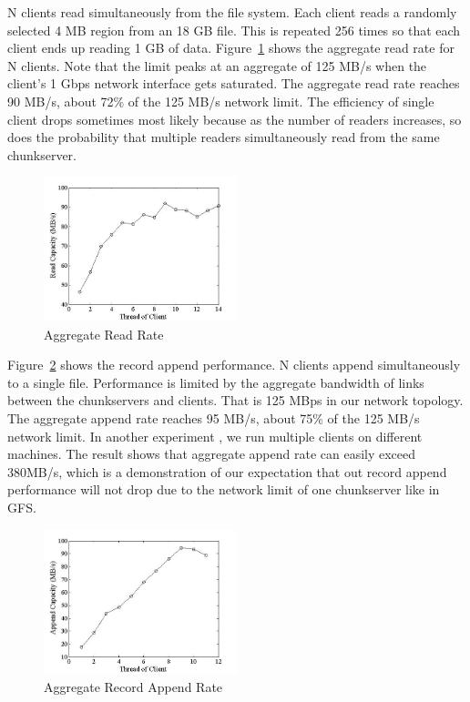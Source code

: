 \documentclass[letterpaper,twocolumn,10pt]{article}
\begin{document}
N clients read simultaneously from the file system. Each client reads a randomly selected 4 MB region from an 18 GB file. This is repeated 256 times so that each client ends up reading 1 GB of data. Figure~\ref{fig:readtest} shows the aggregate read rate for N clients. Note that the limit peaks at an aggregate of 125 MB/s when the client's 1 Gbps network interface gets saturated. The aggregate read rate reaches 90 MB/s, about 72\% of the 125 MB/s network limit. The efficiency of single client drops sometimes most likely because as the number of readers increases, so does the probability that multiple readers simultaneously read from the same chunkserver.
\begin{figure}
\centering
\includegraphics[width=0.5\textwidth]{readtest}
\caption{Aggregate Read Rate}
\label{fig:readtest}
\end{figure}
Figure~\ref{fig:appendtest} shows the record append performance. N clients append simultaneously to a single file. Performance is limited by the aggregate bandwidth of links between the chunkservers and clients. That is 125 MBps in our network topology. The aggregate append rate reaches 95 MB/s, about 75\% of the 125 MB/s network limit. In another experiment , we run multiple clients on different machines. The result shows that aggregate append rate can easily exceed 380MB/s, which is a demonstration of our expectation that out record append performance will not drop due to the network limit of one chunkserver like in GFS. 
\begin{figure}
\centering
\includegraphics[width=0.5\textwidth]{appendtest}
\caption{Aggregate Record Append Rate}
\label{fig:appendtest}
\end{figure}
\end{document}
